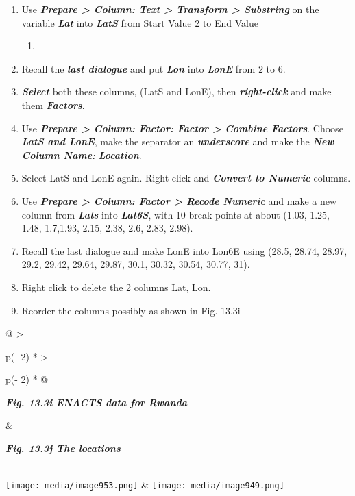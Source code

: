 \documentclass[
  letterpaper,
  DIV=11,
  numbers=noendperiod]{scrreprt}
\providecommand{\tightlist}{%
  \setlength{\itemsep}{0pt}\setlength{\parskip}{0pt}}\usepackage{longtable,booktabs,array}
\begin{document}
\begin{enumerate}
\def\labelenumi{\alph{enumi})}
\item
  Use \textbf{\emph{Prepare \textgreater{} Column: Text \textgreater{}
  Transform \textgreater{} Substring}} on the variable
  \textbf{\emph{Lat}} into \textbf{\emph{LatS}} from Start Value 2 to
  End Value

  \begin{enumerate}
  \def\labelenumii{\arabic{enumii}.}
  \setcounter{enumii}{4}
  \tightlist
  \item
  \end{enumerate}
\item
  Recall the \textbf{\emph{last dialogue}} and put \textbf{\emph{Lon}}
  into \textbf{\emph{LonE}} from 2 to 6.
\item
  \textbf{\emph{Select}} both these columns, (LatS and LonE), then
  \textbf{\emph{right-click}} and make them \textbf{\emph{Factors}}.
\item
  Use \textbf{\emph{Prepare \textgreater{} Column: Factor: Factor
  \textgreater{} Combine Factors}}. Choose \textbf{\emph{LatS and
  LonE}}, make the separator an \textbf{\emph{underscore}} and make the
  \textbf{\emph{New Column Name:}} \textbf{\emph{Location}}.
\item
  Select LatS and LonE again. Right-click and \textbf{\emph{Convert to
  Numeric}} columns.
\item
  Use \textbf{\emph{Prepare \textgreater{} Column: Factor \textgreater{}
  Recode Numeric}} and make a new column from \textbf{\emph{Lats}} into
  \textbf{\emph{Lat6S}}, with 10 break points at about (1.03, 1.25,
  1.48, 1.7,1.93, 2.15, 2.38, 2.6, 2.83, 2.98).
\item
  Recall the last dialogue and make LonE into Lon6E using (28.5, 28.74,
  28.97, 29.2, 29.42, 29.64, 29.87, 30.1, 30.32, 30.54, 30.77, 31).
\item
  Right click to delete the 2 columns Lat, Lon.
\item
  Reorder the columns possibly as shown in Fig. 13.3i
\end{enumerate}

\begin{longtable}[]{@{}
  >{\raggedright\arraybackslash}p{(\columnwidth - 2\tabcolsep) * }
  >{\raggedright\arraybackslash}p{(\columnwidth - 2\tabcolsep) * }@{}}
\toprule\noalign{}
\begin{minipage}[b]{\linewidth}\raggedright
\textbf{\emph{Fig. 13.3i ENACTS data for Rwanda}}
\end{minipage} & \begin{minipage}[b]{\linewidth}\raggedright
\textbf{\emph{Fig. 13.3j The locations}}
\end{minipage} \\
\midrule\noalign{}
\endhead
\bottomrule\noalign{}
\endlastfoot
\texttt{[image: media/image953.png]} &
\texttt{[image: media/image949.png]} \\
\end{longtable}
\end{document}
